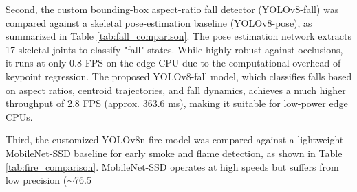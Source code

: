 \documentclass[12pt,a4paper]{article}
\begin{document}
\begin{table}[h]
    \centering
    \caption{Face Verification Model Comparison on Edge Hardware (CPU Mode)}
    \label{tab:face_comparison}
\end{table}

Second, the custom bounding-box aspect-ratio fall detector (YOLOv8-fall) was compared against a skeletal pose-estimation baseline (YOLOv8-pose), as summarized in Table \ref{tab:fall_comparison}. 
The pose estimation network extracts 17 skeletal joints to classify "fall" states. While highly robust against occlusions, it runs at only 0.8 FPS on the edge CPU due to the computational overhead of keypoint regression. The proposed YOLOv8-fall model, which classifies falls based on aspect ratios, centroid trajectories, and fall dynamics, achieves a much higher throughput of 2.8 FPS (approx. 363.6 ms), making it suitable for low-power edge CPUs.

\begin{table}[h]
    \centering
    \caption{Fall Detection Model Comparison on Edge Hardware (CPU Mode)}
    \label{tab:fall_comparison}
\end{table}

Third, the customized YOLOv8n-fire model was compared against a lightweight MobileNet-SSD baseline for early smoke and flame detection, as shown in Table \ref{tab:fire_comparison}. 
MobileNet-SSD operates at high speeds but suffers from low precision ($\sim$76.5%
\end{document}
